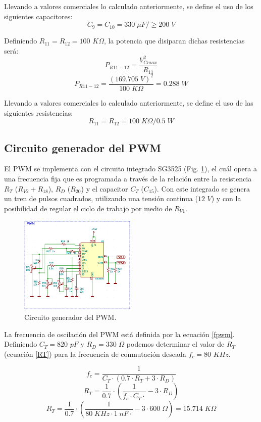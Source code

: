 \documentclass[11pt, a4paper]{article}
\begin{document}
Llevando a valores comerciales lo calculado anteriormente, se define el uso de los siguientes capacitores:
\[ C_9 = C_{10} = 330 \; \mu F / \geq 200 \;V \]

Definiendo $R_{11} = R_{12} = 100$ $K\Omega$, la potencia que disiparan dichas resistencias será:
\begin{equation}
P_{R11-12} = \frac{V_{Cmax}^2}{R_{11}}
\label{PR1112}
\end{equation}
\[ P_{R11-12} = \frac{(169.705 \; V)^2}{100 \; K\Omega } = 0.288 \; W \]

Llevando a valores comerciales lo calculado anteriormente, se define el uso de las siguientes resistencias:
\[ R_{11} = R_{12} = 100 \; K\Omega / 0.5 \;W \]

\subsection{Circuito generador del PWM}
El PWM se implementa con el circuito integrado SG3525 (Fig. \ref{pwm}), el cuál opera a una frecuencia fija que es programada a través de la relación entre la resistencia $R_T$ ($R_{V2} + R_{18}$), $R_D$ ($R_{20}$) y el capacitor $C_T$ ($C_{15}$). Con este integrado se genera un tren de pulsos cuadrados, utilizando una tensión continua ($12$ $V$) y con la posibilidad de regular el ciclo de trabajo por medio de $R_{V1}$.

\begin{figure}[h]
	\centering
		\includegraphics[width = 0.5\textwidth]{Imagenes/PWM}
	\caption{Circuito generador del PWM.}
	\label{pwm}
\end{figure}

La frecuencia de oscilación del PWM está definida por la ecuación \ref{fpwm}. Definiendo $C_T = 820$ $pF$ y $R_D = 330$ $\Omega$ podemos determinar el valor de $R_T$ (ecuación \ref{RT}) para la frecuencia de conmutación deseada $f_c = 80$ $KHz$.

\begin{equation}
f_c = \frac{1}{ C_T \cdot (0.7 \cdot R_T + 3 \cdot R_D)}
\label{fpwm}
\end{equation}
\begin{equation}
R_T = \frac{1}{0.7} \cdot (\frac{1}{f_c \cdot C_T \cdot} - 3 \cdot R_D)
\label{RT}
\end{equation}
\[ R_T = \frac{1}{0.7} \cdot (\frac{1}{80 \; KHz \cdot 1 \; nF \cdot} - 3 \cdot 600 \; \Omega) = 15.714 \; K\Omega \]
\end{document}
